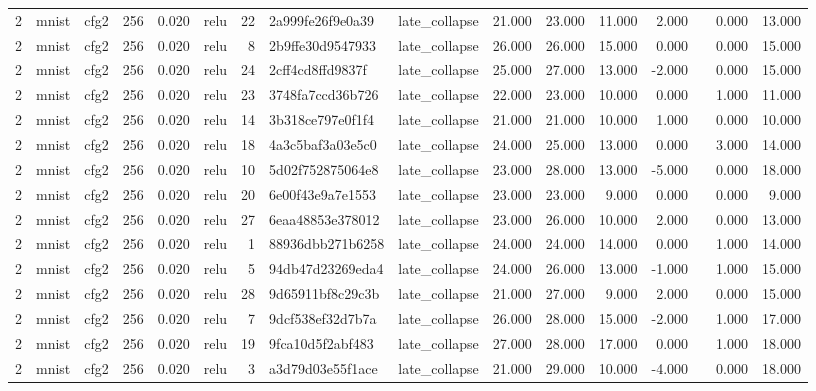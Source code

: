 \begin{table}[htbp]
{\begin{tabular}{@{}rllrrlrllrrrrrrr@{}}
2 & mnist & cfg2 & 256 & 0.020 & relu & 22 & 2a999fe26f9e0a39 & late\_collapse & 21.000 & 23.000 & 11.000 & 2.000 &  & 0.000 & 13.000 \\
2 & mnist & cfg2 & 256 & 0.020 & relu & 8 & 2b9ffe30d9547933 & late\_collapse & 26.000 & 26.000 & 15.000 & 0.000 &  & 0.000 & 15.000 \\
2 & mnist & cfg2 & 256 & 0.020 & relu & 24 & 2cff4cd8ffd9837f & late\_collapse & 25.000 & 27.000 & 13.000 & -2.000 &  & 0.000 & 15.000 \\
2 & mnist & cfg2 & 256 & 0.020 & relu & 23 & 3748fa7ccd36b726 & late\_collapse & 22.000 & 23.000 & 10.000 & 0.000 &  & 1.000 & 11.000 \\
2 & mnist & cfg2 & 256 & 0.020 & relu & 14 & 3b318ce797e0f1f4 & late\_collapse & 21.000 & 21.000 & 10.000 & 1.000 &  & 0.000 & 10.000 \\
2 & mnist & cfg2 & 256 & 0.020 & relu & 18 & 4a3c5baf3a03e5c0 & late\_collapse & 24.000 & 25.000 & 13.000 & 0.000 &  & 3.000 & 14.000 \\
2 & mnist & cfg2 & 256 & 0.020 & relu & 10 & 5d02f752875064e8 & late\_collapse & 23.000 & 28.000 & 13.000 & -5.000 &  & 0.000 & 18.000 \\
2 & mnist & cfg2 & 256 & 0.020 & relu & 20 & 6e00f43e9a7e1553 & late\_collapse & 23.000 & 23.000 & 9.000 & 0.000 &  & 0.000 & 9.000 \\
2 & mnist & cfg2 & 256 & 0.020 & relu & 27 & 6eaa48853e378012 & late\_collapse & 23.000 & 26.000 & 10.000 & 2.000 &  & 0.000 & 13.000 \\
2 & mnist & cfg2 & 256 & 0.020 & relu & 1 & 88936dbb271b6258 & late\_collapse & 24.000 & 24.000 & 14.000 & 0.000 &  & 1.000 & 14.000 \\
2 & mnist & cfg2 & 256 & 0.020 & relu & 5 & 94db47d23269eda4 & late\_collapse & 24.000 & 26.000 & 13.000 & -1.000 &  & 1.000 & 15.000 \\
2 & mnist & cfg2 & 256 & 0.020 & relu & 28 & 9d65911bf8c29c3b & late\_collapse & 21.000 & 27.000 & 9.000 & 2.000 &  & 0.000 & 15.000 \\
2 & mnist & cfg2 & 256 & 0.020 & relu & 7 & 9dcf538ef32d7b7a & late\_collapse & 26.000 & 28.000 & 15.000 & -2.000 &  & 1.000 & 17.000 \\
2 & mnist & cfg2 & 256 & 0.020 & relu & 19 & 9fca10d5f2abf483 & late\_collapse & 27.000 & 28.000 & 17.000 & 0.000 &  & 1.000 & 18.000 \\
2 & mnist & cfg2 & 256 & 0.020 & relu & 3 & a3d79d03e55f1ace & late\_collapse & 21.000 & 29.000 & 10.000 & -4.000 &  & 0.000 & 18.000 \\

\end{tabular}}
\end{table}
